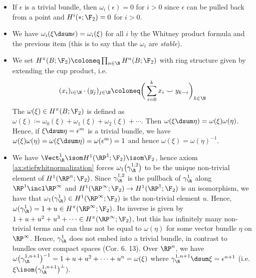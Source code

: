 \begin{itemize}
	\item If $\epsilon$ is a trivial bundle, then $\omega_i(\epsilon) = 0$ for $i > 0$ since $\epsilon$ can be pulled back from a point and $H^i({{*}}; \F_2) = 0$ for $i > 0$.
	\item We have $\omega_i(\xi \dsum \epsilon) = \omega_i(\xi)$ for all $i$ by the Whitney product formula and the previous item (this is to say that the $\omega_i$ are \emph{stable}).
	\item We set $H^\pi(B; \F_2) \coloneq \prod_{n \in \N} H^n(B; \F_2)$ with ring structure given by extending the cup product, i.e.
		\begin{equation*}
			(x_i)_{i \in \N} \cdot (y_j)_{j \in \N} \coloneq \bigg(\sum_{i = 0}^k x_i \smile y_{k - i}\bigg)_{k \in \N}
		\end{equation*}
		The  $\omega(\xi) \in H^\pi(B; \F_2)$ is defined as $\omega(\xi) \coloneq \omega_0(\xi) + \omega_1(\xi) + \omega_2(\xi) + \cdots$.
		Then $\omega(\xi \dsum \eta) = \omega(\xi) \omega(\eta)$.
		Hence, if $\xi \dsum \eta = \epsilon^m$ is a trivial bundle, we have $\omega(\xi) \omega(\eta) = \omega(\xi \dsum \eta) = \omega(\epsilon^m) = 1$ and hence $\omega(\xi) = \omega(\eta)^{-1}$.
	\item We have $\Vect_{\R}^1 \isom H^1(\RP^1; \F_2) \isom \F_2$, hence axiom \ref{ax:stiefwhitnormalization} forces $\omega_1\big(\gamma_{\R}^{1, 2}\big)$ to be the unique non-trivial element of $H^1(\RP^n; \F_2)$.
		Since $\gamma_{\R}^{1, 2}$ is the pullback of $\gamma_{\R}^1$ along $\RP^1 \incl \RP^\infty$ and $H^1(\RP^\infty; \F_2) \to H^1(\RP^1; \F_2)$ is an isomorphism, we have that $\omega_1(\gamma_{\R}^1) \in H^1(\RP^\infty; \F_2)$ is the non-trivial element $u$.
		Hence, $\omega(\gamma_{\R}^1) = 1 + u \in H^\pi(\RP^\infty; \F_2)$.
		Its inverse is given by $1 + u + u^2 + u^3 + \cdots \in H^\pi(\RP^\infty; \F_2)$, but this has infinitely many non-trivial terms and can thus not be equal to $\omega(\eta)$ for some vector bundle $\eta$ on $\RP^\infty$.
		Hence, $\gamma_{\R}^1$ does not embed into a trivial bundle, in contrast to bundles over compact spaces (Cor. 6. 13).
		Over $\RP^n$, we have $\omega\big(\gamma_{\R}^{1, n + 1}\big)^{-1} = 1 + u + u^2 + \cdots + u^n = \omega(\xi)$ where $\gamma_{\R}^{1, n + 1} \dsum \xi = \epsilon^{n + 1}$ (i.e. $\xi \isom \big(\gamma_{\R}^{1, n + 1}\big)^\perp$).
\end{itemize}
